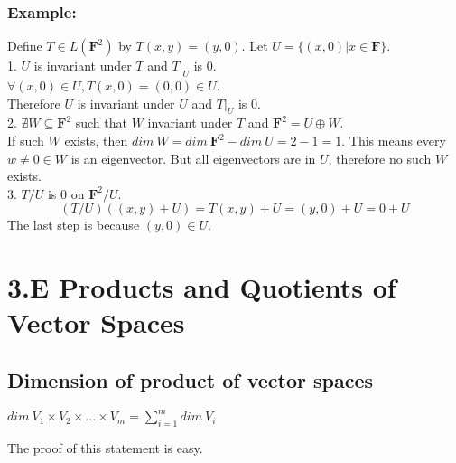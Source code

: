 \documentclass{article}
\begin{document}
\subsubsection{Example:}
\begin{addmargin}[1em]{0em}
Define $T \in L(\textbf{F}^2)$ by $T(x,y) = (y,0)$. Let $U = \{(x,0)|x \in \textbf{F}\}$.\\
1. $U$ is invariant under $T$ and $T|_U$ is $0$.\\
$\forall (x, 0) \in U, T(x,0) = (0, 0) \in U$.\\
Therefore $U$ is invariant under $U$ and $T|_U$ is $0$.\\
2. $\nexists W \subseteq \textbf{F}^2$ such that $W$ invariant under $T$ and $\textbf{F}^2 = U \oplus W$.\\
If such $W$ exists, then $dim\ W = dim\ \textbf{F}^2 - dim\ U = 2 - 1 = 1$. This means every $w \neq 0 \in W$ is an eigenvector. But all eigenvectors are in $U$, therefore no such $W$ exists.\\
3. $T/U$ is $0$ on $\textbf{F}^2/U$.\\
\begin{equation*}
    (T/U)((x,y) + U) = T(x, y) + U = (y, 0) + U = 0 + U
\end{equation*}
The last step is because $(y, 0) \in U$.
\end{addmargin}
\section{3.E Products and Quotients of Vector Spaces}
\subsection{Dimension of product of vector spaces}
\begin{addmargin}[1em]{0em}
$dim\ V_1 \times V_2 \times ... \times V_m = \sum_{i=1}^{m} dim\ V_i$
\end{addmargin}
The proof of this statement is easy.
\end{document}
